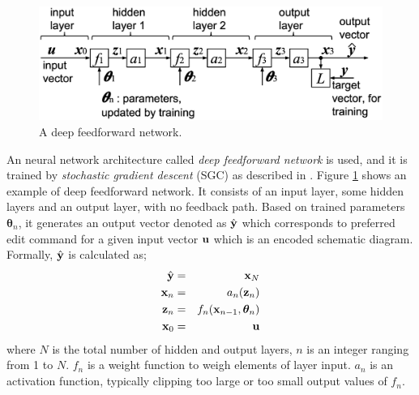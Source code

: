 \documentclass[twocolumn]{article}
\begin{document}
\begin{figure}[!tb]
 \begin{center}
  \begin{minipage}{\hsize}
   \includegraphics[width=\hsize]{fig/deep_feedforward_03.eps}
   \caption{A deep feedforward network.}
   \label{fig:deep_feedforward}
  \end{minipage}
 \end{center}
\end{figure}

An neural network architecture called {\it deep feedforward network} is used,
and it is trained by {\it stochastic gradient descent} (SGC)
as described in \cite{mit}.
Figure \ref{fig:deep_feedforward} shows an example of deep feedforward network.
It consists of an input layer, some hidden layers and an output layer,
with no feedback path.
Based on trained parameters ${\bm \theta}_n$,
it generates an output vector denoted as $\hat{\bf y}$
which corresponds to preferred edit command for a given input vector
${\bf u}$ which is an encoded schematic diagram.
Formally, $\hat{\bf y}$ is calculated as;
\begin{eqnarray}
\hat{\bf y} &=& {\bf x}_N \\
{\bf x}_n &=& a_n({\bf z}_n) \\
{\bf z}_n &=& f_n({\bf x}_{n-1}, {\bm \theta}_n)\\
{\bf x}_0 &=& {\bf u}
\end{eqnarray}
where $N$ is the total number of hidden and output layers,
$n$ is an integer ranging from 1 to $N$.
$f_n$ is a weight function to weigh elements of layer input.
$a_n$ is an activation function,
typically clipping too large or too small output values of $f_n$.
\end{document}
